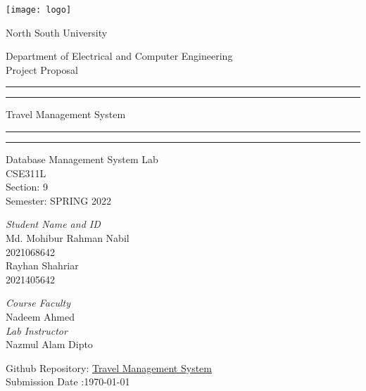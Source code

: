 \documentclass[12pt,a4paper,twoside,openright]{report}
\begin{document}
\begin{center}
\texttt{[image: logo]}
\end{center}
\begin{center}
\vspace{0.2cm} \LARGE {\huge North \huge South \huge University}

\vspace{0.2cm}
\large{Department of Electrical and Computer Engineering}\\
\vspace{0.3cm}
\LARGE {\huge Project \huge Proposal}
\end{center}
\begin{center}
\rule{\textwidth}{1pt}
\hrule{\vspace{0.2cm} \Huge{Travel Management System}}\relax\\
\rule{\textwidth}{1pt}
\hrule
\end{center}
\begin{center}
\vspace{0.1cm}
Database Management System Lab\\
CSE311L\\
Section: 9\\
Semester: SPRING 2022\\

\end{center}
\vspace{1cm}
\begin{minipage}[t] {0.6\textwidth}
\emph{Student Name and ID}\vspace{0.1cm}\\
Md. Mohibur Rahman Nabil\\
2021068642\\

Rayhan Shahriar\\
2021405642\\
\end{minipage}
\begin{minipage}[t] {0.6667\textwidth}
\emph{Course Faculty}\vspace{0.1cm}\\
Nadeem Ahmed\\

\emph{Lab Instructor}\vspace{0.1cm}\\
Nazmul Alam Dipto\\
\end{minipage}
\begin{center}
\vspace{0.5cm}
Github Repository: \href{https://github.com/mohiburnabil/Travel-Management-System}{Travel Management System}\\
\vspace{0.5cm}
Submission Date :\today
\end{center}
\end{document}
